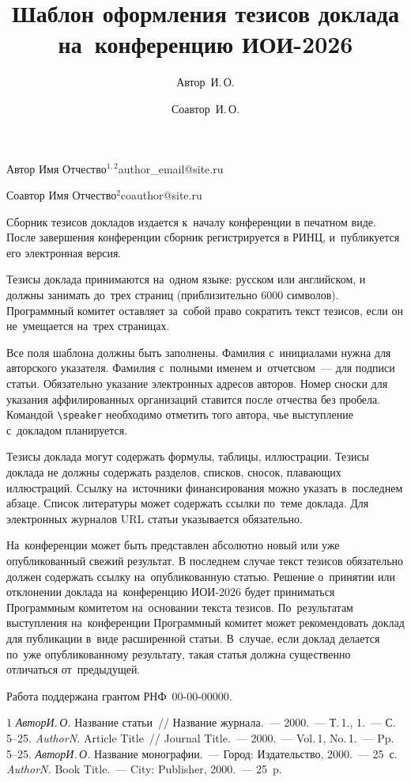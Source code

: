 \documentclass[twoside]{article}
\begin{document}
\Russian
\title{Шаблон оформления тезисов доклада на~конференцию ИОИ-2026}
\author{Автор~И.\,О.}{Автор Имя Отчество$^{1, 2}$}{author\_email@site.ru}
\author{Соавтор~И.\,О.}{Соавтор Имя Отчество$^2$\speaker}{coauthor@site.ru}
\maketitle

Сборник тезисов докладов издается к~началу конференции в печатном виде.
После завершения конференции сборник регистрируется в РИНЦ, и~публикуется его электронная версия.

Тезисы доклада принимаются на~одном языке: русском или английском, и должны занимать до~трех страниц 
 (приблизительно 6000 символов).
Программный комитет оставляет за~собой право сократить текст тезисов,
если он не~умещается на~трех страницах.

Все поля шаблона должны быть заполнены.
Фамилия с~инициалами нужна для авторского указателя.
Фамилия с~полными именем и~отчетсвом~--- для подписи статьи.
Обязательно указание электронных адресов авторов.
Номер сноски для указания аффилированных организаций ставится после отчества без пробела.
Командой \verb|\speaker| необходимо отметить того автора, чье выступление с~докладом планируется.

Тезисы доклада могут содержать формулы, таблицы, иллюстрации.
Тезисы доклада не должны содержать разделов, списков, сносок, плавающих иллюстраций.
Ссылку на~источники финансирования можно указать в~последнем абзаце.
Список литературы может содержать ссылки по~теме доклада.
Для электронных журналов URL статьи указывается обязательно.

На~конференции может быть представлен абсолютно новый или уже опубликованный свежий результат.
В последнем случае текст тезисов обязательно должен содержать ссылку на~опубликованную статью.
Решение о~принятии или отклонении доклада на~конференцию ИОИ-2026
будет приниматься Программным комитетом на~основании текста тезисов.
По~результатам выступления на~конференции Программный комитет может рекомендовать доклад для публикации в~виде расширенной статьи.
В~случае, если доклад делается по~уже опубликованному результату, такая статья должна существенно отличаться от~предыдущей.

Работа поддержана грантом РНФ \No\,00-00-00000.

\begin{thebibliography}{1}
    \emph{Автор\;И.\,О.}
    Название статьи~//
    Название журнала.~--- 2000.~--- Т.\,1.,\,\No\,1.~--- С.\,5--25.
    \emph{Author\;N.}
    Article Title~//
    Journal Title.~--- 2000.~--- Vol.\,1, No.\,1.~--- Pp.\,5--25.
    \emph{Автор\;И.\,О.}
    Название монографии.~--- Город: Издательство, 2000.~--- 25~с.
    \emph{Author\;N.}
    Book Title.~--- City: Publisher, 2000.~--- 25~p.
\end{thebibliography}
\end{document}
